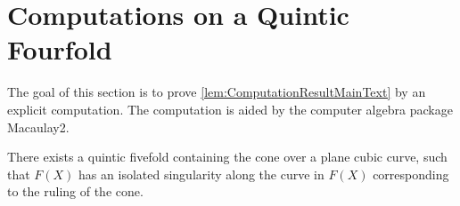 \chapter{Computations on a Quintic Fourfold}
\label{app:Appendix}
\setcounter{section}{1}

\label{app:QuinticComputation}
The goal of this section is to prove \cref{lem:ComputationResultMainText} by an explicit computation. The computation is aided by the computer algebra package Macaulay2.
\begin{lemma}[{= \cref{lem:ComputationResultMainText}}]
	\label{lem:ComputationResultAppendix}
	There exists a quintic fivefold containing the cone over a plane cubic curve, such that $F(X)$ has an isolated singularity along the curve in $F(X)$ corresponding to the ruling of the cone.
\end{lemma}
